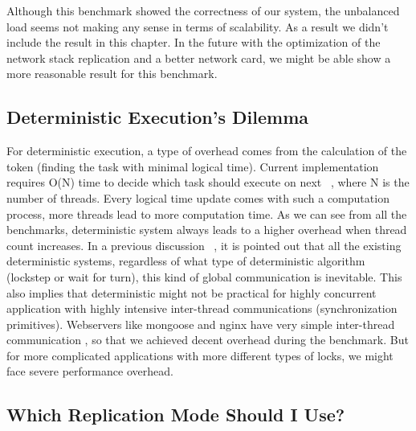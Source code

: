 Although this benchmark showed the correctness of our system, the unbalanced load seems not making any sense in terms of scalability. As a result we didn't include the result in this chapter. In the future with the optimization of the network stack replication and a better network card, we might be able show a more reasonable result for this benchmark.

\subsection{Deterministic Execution's Dilemma}
For deterministic execution, a type of overhead comes from the calculation of the token (finding the task with minimal logical time). Current implementation requires O(N) time to decide which task should execute on next \detstart\ , where N is the number of threads. Every logical time update comes with such a computation process, more threads lead to more computation time.  As we can see from all the benchmarks, deterministic system always leads to a higher overhead when thread count increases. In a previous discussion ~\cite{bergan2011deterministic}, it is pointed out that all the existing deterministic systems, regardless of what type of deterministic algorithm (lockstep or wait for turn), this kind of global communication is inevitable. This also implies that deterministic might not be practical for highly concurrent application with highly intensive inter-thread communications (synchronization primitives). Webservers like mongoose and nginx have very simple inter-thread communication , so that we achieved decent overhead during the benchmark. But for more complicated applications with more different types of locks, we might face severe performance overhead.

\subsection{Which Replication Mode Should I Use?}
